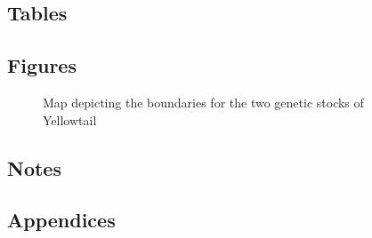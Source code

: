 \documentclass[
]{scrartcl}
\begin{document}
\newpage{}

\subsection{Tables}\label{tables}

\newpage{}

\subsection{Figures}\label{figures}

\begin{figure}


\caption{\label{fig-assessregionmap}Map depicting the boundaries for the
two genetic stocks of Yellowtail}

\end{figure}%

\newpage{}

\subsection{Notes}\label{notes}

\newpage{}

\subsection{Appendices}\label{sec-appendix}
\end{document}
